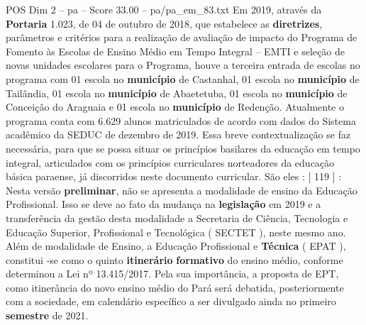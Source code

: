 \begin{textsample}{POS Dim 2 – pa – Score 33.00 – pa/pa\_em\_83.txt}
Em 2019, através da \textbf{Portaria} 1.023, de 04 de outubro de 2018, que estabelece as \textbf{diretrizes}, parâmetros e critérios para a realização de avaliação de impacto do Programa de Fomento às Escolas de Ensino Médio em Tempo Integral – EMTI e seleção de novas unidades escolares para o Programa, houve a terceira entrada de escolas no programa com 01 escola no \textbf{município} de Castanhal, 01 escola no \textbf{município} de Tailândia, 01 escola no \textbf{município} de Abaetetuba, 01 escola no \textbf{município} de Conceição do Araguaia e 01 escola no \textbf{município} de Redenção.
Atualmente o programa conta com 6.629 alunos matriculados de acordo com dados do Sistema acadêmico da SEDUC de dezembro de 2019.
Essa breve contextualização se faz necessária, para que se possa situar os princípios basilares da educação em tempo integral, articulados com os princípios curriculares norteadores da educação básica paraense, já discorridos neste documento curricular.
São eles : [ 119 ] : Nesta versão \textbf{preliminar}, não se apresenta a modalidade de ensino da Educação Profissional.
Isso se deve ao fato da mudança na \textbf{legislação} em 2019 e a transferência da gestão desta modalidade a Secretaria de Ciência, Tecnologia e Educação Superior, Profissional e Tecnológica ( SECTET ), neste mesmo ano.
Além de modalidade de Ensino, a Educação Profissional e \textbf{Técnica} ( EPAT ), constitui -se como o quinto \textbf{itinerário} \textbf{formativo} do ensino médio, conforme determinou a Lei nº 13.415/2017.
Pela sua importância, a proposta de EPT, como itinerância do novo ensino médio do Pará será debatida, posteriormente com a sociedade, em calendário específico a ser divulgado ainda no primeiro \textbf{semestre} de 2021.

\end{textsample}
